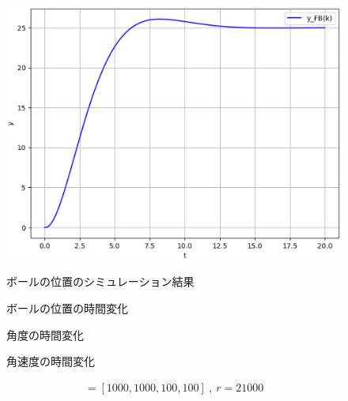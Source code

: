 \documentclass[a4paper,10.5pt]{ltjsarticle}
\begin{document}
\begin{figure}[h]
  \centering
  \vspace{-30pt}
  \begin{minipage}[h]{0.4\linewidth}
    \centering
    \includegraphics[scale=0.35]{figure17.eps}
    \caption{ボールの位置のシミュレーション結果}
    \label{fig:figure20}
  \end{minipage}
  \begin{minipage}[h]{0.4\linewidth}
    \centering
    
    \vspace{-30pt}\caption{ボールの位置の時間変化}
    \label{fig:figure21}
  \end{minipage}
  \begin{minipage}[h]{0.4\linewidth}
    \centering
    
    \vspace{-30pt}\caption{角度の時間変化}
    \label{fig:figure22}
  \end{minipage}
  \begin{minipage}[h]{0.4\linewidth}
    \centering
    
    \vspace{-30pt}\caption{角速度の時間変化}
    \label{fig:figure23}
  \end{minipage}
\end{figure}
\clearpage
\begin{align}
  [q_1,q_2,q_3,q_4]=[1000,1000,100,100]\ ,\ r=21000
\end{align}
\end{document}
